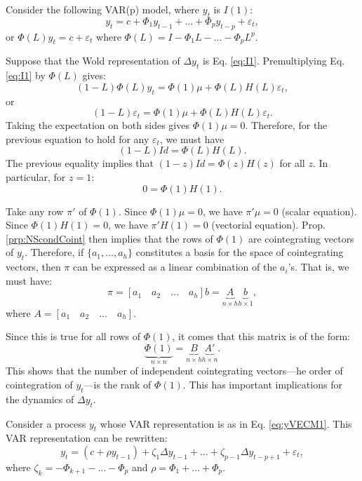 \documentclass[
  12pt,
]{book}
\theoremstyle{definition}
\theoremstyle{definition}
\theoremstyle{definition}
\theoremstyle{definition}
\theoremstyle{remark}
\begin{document}
Consider the following VAR(p) model, where \(y_t\) is \(I(1)\):
\begin{equation}
y_t = c + \Phi_1 y_{t-1} + \dots + \Phi_p y_{t-p} + \varepsilon_t,\label{eq:yVECM1}
\end{equation}
or \(\Phi(L)y_t = c + \varepsilon_t\) where \(\Phi(L) = I - \Phi_1 L - \dots - \Phi_p L^p\).

Suppose that the Wold representation of \(\Delta y_t\) is Eq. \eqref{eq:I1}. Premultiplying Eq. \eqref{eq:I1} by \(\Phi(L)\) gives:
\[
(1-L)\Phi(L)y_t = \Phi(1)\mu + \Phi(L)H(L)\varepsilon_t,
\]
or
\[
(1-L)\varepsilon_t = \Phi(1)\mu + \Phi(L)H(L)\varepsilon_t.
\]
Taking the expectation on both sides gives \(\Phi(1)\mu=0\). Therefore, for the previous equation to hold for any \(\varepsilon_t\), we must have
\[
(1-L) Id = \Phi(L)H(L).
\]
The previous equality implies that \((1-z) Id = \Phi(z)H(z)\) for all \(z\). In particular, for \(z=1\):
\[
0 = \Phi(1)H(1).
\]

Take any row \(\pi'\) of \(\Phi(1)\). Since \(\Phi(1)\mu=0\), we have \(\pi'\mu=0\) (scalar equation). Since \(\Phi(1)H(1)=0\), we have \(\pi' H(1)=0\) (vectorial equation). Prop. \ref{prp:NScondCoint} then implies that the rows of \(\Phi(1)\) are cointegrating vectors of \(y_t\). Therefore, if \(\{a_1,\dots,a_h\}\) constitutes a basis for the space of cointegrating vectors, then \(\pi\) can be expressed as a linear combination of the \(a_i\)'s. That is, we must have:
\[
\pi = [a_1 \quad a_2 \quad \dots \quad a_h]b = \underbrace{A}_{n\times h}\underbrace{b}_{h \times 1},
\]
where \(A = [a_1 \quad a_2 \quad \dots \quad a_h]\).

Since this is true for all rows of \(\Phi(1)\), it comes that this matrix is of the form:
\begin{equation}
\underbrace{\Phi(1)}_{n\times n} = \underbrace{B}_{n\times h}\underbrace{A'}_{h\times n}.\label{eq:BAvecm}
\end{equation}
This shows that the number of independent cointegrating vectors---he order of cointegration of \(y_t\)---is the rank of \(\Phi(1)\). This has important implications for the dynamics of \(\Delta y_t\).

Consider a process \(y_t\) whose VAR representation is as in Eq. \eqref{eq:yVECM1}. This VAR representation can be rewritten:
\begin{equation}
y_t = (c + \rho y_{t-1}) + \zeta_1 \Delta y_{t-1} + \dots + \zeta_{p-1} \Delta y_{t-p+1} + \varepsilon_t,\label{eq:yVECM2}
\end{equation}
where \(\zeta_k = - \Phi_{k+1} - \dots - \Phi_{p}\) and \(\rho = \Phi_1 + \dots + \Phi_p\).
\end{document}
